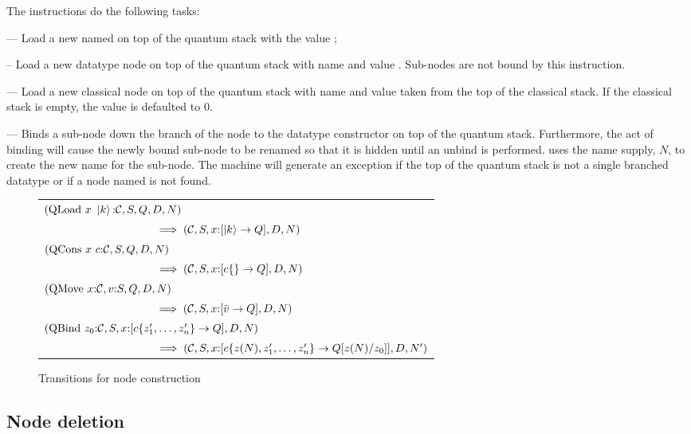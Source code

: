 The instructions do the following tasks:
\begin{description}
\item{} --- Load a new \qubit{} named 
 on top of the quantum stack with the value ;
\item{} -- Load a new datatype node on top of the
quantum stack with name  and value .
Sub-nodes are not bound  by this instruction.
\item{} --- Load a new classical node on top of the
quantum stack with name  and value taken from the
top of the classical stack. If the classical stack is empty, the
value is defaulted to $0$.
\item{} --- Binds a sub-node down the 
branch of the node to the datatype constructor on top of the 
quantum stack. Furthermore, the act of binding will
cause the newly bound sub-node to be renamed so that it is
hidden until an unbind is performed.  
uses the name supply,
$N$, to create the new  name for the sub-node. The machine will
generate an exception if the top of the quantum stack is not a
single branched datatype or if a node named  is not found. 
\end{description}


\begin{figure}[htbp]
\begin{tabular}{l}
$(\mathrm{QLoad}\ x\ \ket{k}{:}\cd,S,Q,D,N)  $ \\
$ \qquad\qquad\qquad\qquad\qquad\implies(\mathcal{C},S,x{:}[\left\vert{k}\right\rangle\to Q],D,N)$ \\
$(\mathrm{QCons}\ x\ c{:}\mathcal{C},S,Q,D,N) $ \\
$ \qquad\qquad\qquad\qquad\qquad\implies (\mathcal{C}, S,x{:}[c\{\}\to Q],D,N) $ \\
$ (\mathrm{QMove}\ x{:}\mathcal{C},v{:}S,Q,D,N) $ \\
$ \qquad\qquad\qquad\qquad\qquad\implies (\mathcal{C},S,x{:}[\bar{v}\to Q],D,N)$ \\
$(\mathrm{QBind}\ z_0{:}\cd,S,x{:}[c\{z_1',\ldots,z_n'\}\to Q],D,N) $\\
$ \qquad\qquad\qquad\qquad\qquad \implies (\mathcal{C},S,x{:}[c\{z(N),z_1',\ldots,z_n'\}\to Q[z(N)/z_0]],D,N') $
\end{tabular}
\caption{Transitions for node construction}\label{fig:trans:nodeconstruction}
\end{figure}



\subsection{Node deletion}\label{subsec:nodedeletion}

